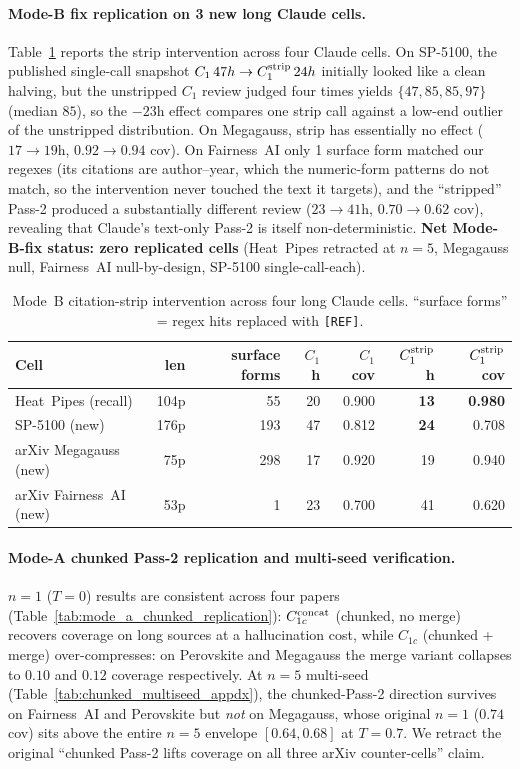 \documentclass[11pt]{article}
\begin{document}
\paragraph{Mode-B fix replication on 3 new long Claude cells.}
Table~\ref{tab:mode_b_strip_replication} reports the strip intervention across four Claude cells. On SP-5100, the published single-call snapshot $C_1\,47h \to C_1^{\rm strip}\,24h$ initially looked like a clean halving, but the unstripped $C_1$ review judged four times yields $\{47, 85, 85, 97\}$ (median $85$), so the $-23$h effect compares one strip call against a low-end outlier of the unstripped distribution. On Megagauss, strip has essentially no effect ($17\to 19$h, $0.92\to 0.94$ cov). On Fairness~AI only 1 surface form matched our regexes (its citations are author--year, which the numeric-form patterns do not match, so the intervention never touched the text it targets), and the ``stripped'' Pass-2 produced a substantially different review ($23\to 41$h, $0.70\to 0.62$ cov), revealing that Claude's text-only Pass-2 is itself non-deterministic. \textbf{Net Mode-B-fix status: zero replicated cells} (Heat~Pipes retracted at $n{=}5$, Megagauss null, Fairness~AI null-by-design, SP-5100 single-call-each).

\begin{table}[h]
\centering
\caption{Mode~B citation-strip intervention across four long Claude cells. ``surface forms'' = regex hits replaced with \texttt{[REF]}.}
\label{tab:mode_b_strip_replication}
\small
\begin{tabular}{lrrrrrr}
\toprule
Cell & len & surface forms & $C_1$ h & $C_1$ cov & $C_1^{\rm strip}$ h & $C_1^{\rm strip}$ cov \\
\midrule
Heat~Pipes (recall)        & 104p & 55  & 20 & 0.900 & \textbf{13} & \textbf{0.980} \\
SP-5100 (new)              & 176p & 193 & 47 & 0.812 & \textbf{24} & 0.708 \\
arXiv Megagauss (new)      &  75p & 298 & 17 & 0.920 & 19 & 0.940 \\
arXiv Fairness~AI (new)    &  53p & 1   & 23 & 0.700 & 41 & 0.620 \\
\bottomrule
\end{tabular}
\end{table}

\paragraph{Mode-A chunked Pass-2 replication and multi-seed verification.}
$n{=}1$ ($T{=}0$) results are consistent across four papers (Table~\ref{tab:mode_a_chunked_replication}): $C_{1c}^{\rm concat}$ (chunked, no merge) recovers coverage on long sources at a hallucination cost, while $C_{1c}$ (chunked + merge) over-compresses: on Perovskite and Megagauss the merge variant collapses to $0.10$ and $0.12$ coverage respectively. At $n{=}5$ multi-seed (Table~\ref{tab:chunked_multiseed_appdx}), the chunked-Pass-2 direction survives on Fairness~AI and Perovskite but \emph{not} on Megagauss, whose original $n{=}1$ ($0.74$cov) sits above the entire $n{=}5$ envelope $[0.64, 0.68]$ at $T{=}0.7$. We retract the original ``chunked Pass-2 lifts coverage on all three arXiv counter-cells'' claim.
\end{document}

